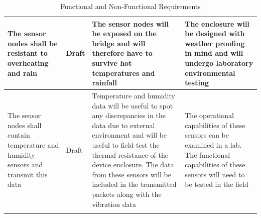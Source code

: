 \begin{longtable}{ | p{3.5cm} | p{1.25cm}| p{4.5cm} | p{4.5cm} | }
\hline
[NFR-1] 	The sensor nodes shall be resistant to overheating and rain& Draft& The sensor nodes will be exposed on the bridge and will therefore have to survive hot temperatures and rainfall& The enclosure will be designed with weather proofing in mind and will undergo laboratory environmental testing \\
\hline
[NFR-2] 	The sensor nodes shall contain temperature and humidity sensors and transmit this data& Draft& 	Temperature and humidity data will be useful to spot any discrepancies in the data due to external environment and will be useful to field test the thermal resistance of the device enclosure. The data from these sensors will be included in the transmitted packets along with the vibration data& The operational capabilities of these sensors can be examined in a lab. The functional capabilities of these sensors will need to be tested in the field \\
\hline
\caption{Functional and Non-Functional Requirements}
\label{tab:FRandNFR}
\end{longtable}



